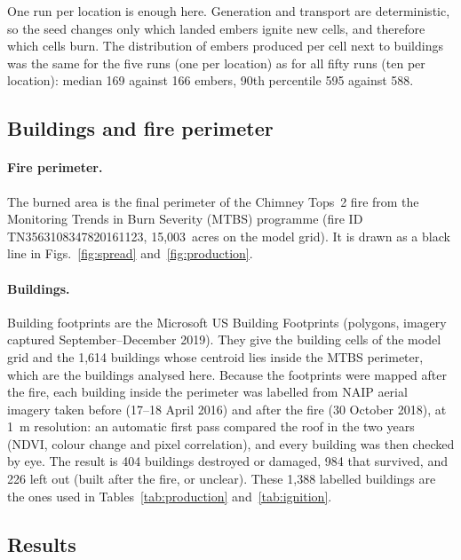 One run per location is enough here. Generation and transport are deterministic, so the seed changes
only which landed embers ignite new cells, and therefore which cells burn. The distribution of embers
produced per cell next to buildings was the same for the five runs (one per location) as for all
fifty runs (ten per location): median 169 against 166 embers, 90th percentile 595 against 588.

\subsection{Buildings and fire perimeter}
\paragraph{Fire perimeter.} The burned area is the final perimeter of the Chimney Tops~2 fire from the
Monitoring Trends in Burn Severity (MTBS) programme (fire ID TN3563108347820161123, 15{,}003~acres on the
model grid). It is drawn as a black line in Figs.~\ref{fig:spread} and~\ref{fig:production}.

\paragraph{Buildings.} Building footprints are the Microsoft US Building Footprints (polygons, imagery
captured September--December 2019). They give the building cells of the model grid
and the 1{,}614 buildings whose centroid lies inside the MTBS perimeter, which are the buildings analysed
here. Because the footprints were mapped after the fire, each building inside the perimeter was labelled
from NAIP aerial imagery taken before (17--18 April 2016) and after the fire (30 October 2018), at 1~m
resolution: an automatic first pass compared the roof in the two years (NDVI, colour change and pixel
correlation), and every building was then checked by eye. The result is 404 buildings destroyed or
damaged, 984 that survived, and 226 left out (built after the fire, or unclear). These 1{,}388 labelled
buildings are the ones used in Tables~\ref{tab:production} and~\ref{tab:ignition}.

\subsection{Results}

